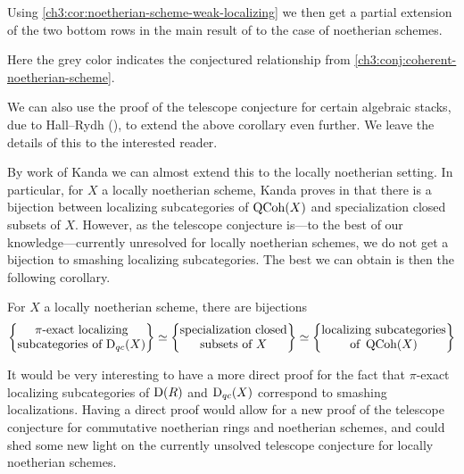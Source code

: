 Using \cref{ch3:cor:noetherian-scheme-weak-localizing} we then get a partial extension of the two bottom rows in the main result of \cite{takahashi_2009} to the case of noetherian schemes.  

\begin{center}
\end{center}

Here the grey color indicates the conjectured relationship from \cref{ch3:conj:coherent-noetherian-scheme}. 

We can also use the proof of the telescope conjecture for certain algebraic stacks, due to Hall--Rydh (\cite{hall-rydh_2017}), to extend the above corollary even further. We leave the details of this to the interested reader. 

By work of Kanda we can almost extend this to the locally noetherian setting. In particular, for $X$ a locally noetherian scheme, Kanda proves in \cite[1.4]{kanda_2015} that there is a bijection between localizing subcategories of $\operatorname{QCoh}(X)$ and specialization closed subsets of $X$. However, as the telescope conjecture is---to the best of our knowledge---currently unresolved for locally noetherian schemes, we do not get a bijection to smashing localizing subcategories. The best we can obtain is then the following corollary. 

\begin{corollary}
    For $X$ a locally noetherian scheme, there are bijections
    \[\left\{ \begin{matrix} \pi\text{-exact localizing}\\ \text{subcategories of }\mathrm{D}_{qc}(X) \end{matrix} \right\}\simeq \left\{ \begin{matrix} \text{specialization closed}\\ \text{subsets of }X \end{matrix} \right\} \simeq \left\{ \begin{matrix} \text{localizing subcategories}\\ \text{of }\operatorname{QCoh}(X) \end{matrix} \right\}\]
\end{corollary}

\begin{remark}
    It would be very interesting to have a more direct proof for the fact that $\pi$-exact localizing subcategories of $\mathrm{D}(R)$ and $\mathrm{D}_{qc}(X)$ correspond to smashing localizations. Having a direct proof would allow for a new proof of the telescope conjecture for commutative noetherian rings and noetherian schemes, and could shed some new light on the currently unsolved telescope conjecture for locally noetherian schemes. 
\end{remark}

